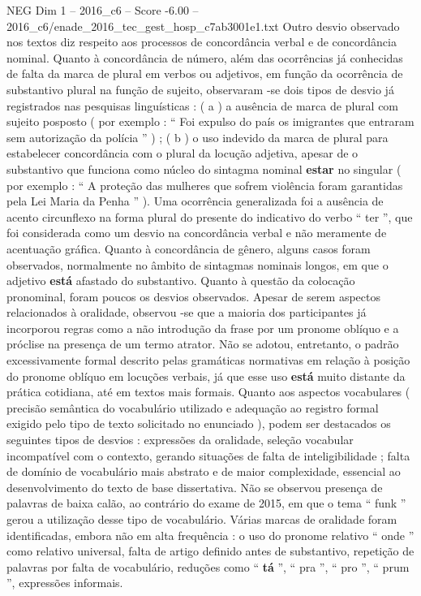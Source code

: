 \begin{textsample}{NEG Dim 1 – 2016\_c6 – Score -6.00 – 2016\_c6/enade\_2016\_tec\_gest\_hosp\_c7ab3001e1.txt}
Outro desvio observado nos textos diz respeito aos processos de concordância verbal e de concordância nominal.
Quanto à concordância de número, além das ocorrências já conhecidas de falta da marca de plural em verbos ou adjetivos, em função da ocorrência de substantivo plural na função de sujeito, observaram -se dois tipos de desvio já registrados nas pesquisas linguísticas : ( a ) a ausência de marca de plural com sujeito posposto ( por exemplo : “ Foi expulso do país os imigrantes que entraram sem autorização da polícia ” ) ; ( b ) o uso indevido da marca de plural para estabelecer concordância com o plural da locução adjetiva, apesar de o substantivo que funciona como núcleo do sintagma nominal \textbf{estar} no singular ( por exemplo : “ A proteção das mulheres que sofrem violência foram garantidas pela Lei Maria da Penha ” ).
Uma ocorrência generalizada foi a ausência de acento circunflexo na forma plural do presente do indicativo do verbo “ ter ”, que foi considerada como um desvio na concordância verbal e não meramente de acentuação gráfica.
Quanto à concordância de gênero, alguns casos foram observados, normalmente no âmbito de sintagmas nominais longos, em que o adjetivo \textbf{está} afastado do substantivo.
Quanto à questão da colocação pronominal, foram poucos os desvios observados.
Apesar de serem aspectos relacionados à oralidade, observou -se que a maioria dos participantes já incorporou regras como a não introdução da frase por um pronome oblíquo e a próclise na presença de um termo atrator.
Não se adotou, entretanto, o padrão excessivamente formal descrito pelas gramáticas normativas em relação à posição do pronome oblíquo em locuções verbais, já que esse uso \textbf{está} muito distante da prática cotidiana, até em textos mais formais.
Quanto aos aspectos vocabulares ( precisão semântica do vocabulário utilizado e adequação ao registro formal exigido pelo tipo de texto solicitado no enunciado ), podem ser destacados os seguintes tipos de desvios : expressões da oralidade, seleção vocabular incompatível com o contexto, gerando situações de falta de inteligibilidade ; falta de domínio de vocabulário mais abstrato e de maior complexidade, essencial ao desenvolvimento do texto de base dissertativa.
Não se observou presença de palavras de baixa calão, ao contrário do exame de 2015, em que o tema “ funk ” gerou a utilização desse tipo de vocabulário.
Várias marcas de oralidade foram identificadas, embora não em alta frequência : o uso do pronome relativo “ onde ” como relativo universal, falta de artigo definido antes de substantivo, repetição de palavras por falta de vocabulário, reduções como “ \textbf{tá} ”, “ pra ”, “ pro ”, “ prum ”, expressões informais.

\end{textsample}
